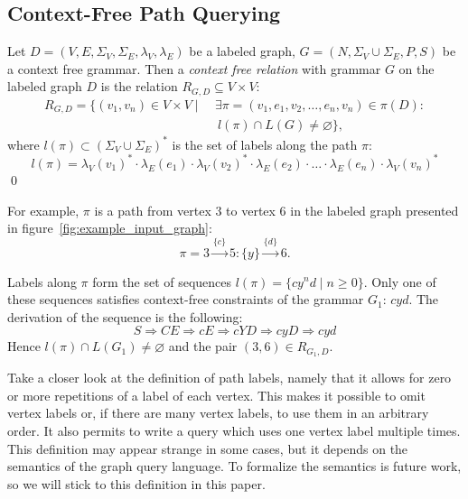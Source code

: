 \subsection{Context-Free Path Querying}

\begin{definition}
Let $D = (V, E, \Sigma_V, \Sigma_E, \lambda_V, \lambda_E)$ be a labeled graph, $G = (N, \Sigma_V \cup \Sigma_E, P, S)$ be a context free grammar. Then a \emph{context free relation} with grammar $G$ on the labeled graph $D$ is the relation $R_{G, D} \subseteq V \times V$:
\begin{equation*} \label{eq1}
\begin{split}
R_{G, D} = \{(v_1, v_n) \in V \times V  \mid \ &\exists \pi = (v_1, e_1, v_2, \ldots, e_n, v_n) \in \pi(D): \\
      &\ l(\pi) \cap L(G) \neq \varnothing \},
\end{split}
\end{equation*}
where $l(\pi) \subset (\Sigma_V \cup \Sigma_E)^*$ is the set of labels along the path $\pi$:
$$l(\pi) = \lambda_V(v_1)^* \cdot \lambda_E(e_1) \cdot \lambda_V(v_2)^* \cdot \lambda_E(e_2) \cdot \ldots \cdot \lambda_E(e_n) \cdot \lambda_V(v_n)^*$$
\qed
\end{definition}

For example, $\pi$ is a path from vertex 3 to vertex 6 in the labeled graph presented in figure~\ref{fig:example_input_graph}:
$$\pi=3 \xrightarrow{\{c\}} 5:\{y\} \xrightarrow{\{d\}} 6.$$

Labels along $\pi$ form the set of sequences $l(\pi) = \{cy^nd \mid n \geq 0\}$.
Only one of these sequences satisfies context-free constraints of the grammar $G_1$: $cyd$.
The derivation of the sequence is the following:
    $$
         S \Rightarrow CE \Rightarrow cE \Rightarrow cYD \Rightarrow cyD \Rightarrow cyd
    $$
Hence $l(\pi) \cap L(G_1) \neq \varnothing$ and the pair $(3,6) \in R_{G_1, D}$.

Take a closer look at the definition of path labels, namely that it allows for zero or more repetitions of a label of each vertex.
This makes it possible to omit vertex labels or, if there are many vertex labels, to use them in an arbitrary order.
It also permits to write a query which uses one vertex label multiple times.
This definition may appear strange in some cases, but it depends on the semantics of the graph query language.
To formalize the semantics is future work, so we will stick to this definition in this paper.

